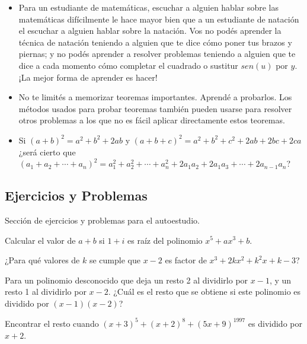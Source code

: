 \begin{itemize}
    \item Para un estudiante de matemáticas, escuchar a alguien hablar sobre las matemáticas difícilmente le hace mayor bien que a un estudiante de natación el escuchar a alguien hablar sobre la natación.
    Vos no podés aprender la técnica de natación teniendo a alguien que te dice cómo poner tus brazos y piernas; y no podés aprender a resolver problemas teniendo a alguien que te dice a cada momento cómo completar el cuadrado o sustitur $sen(u)$ por $y$.
    ¡La mejor forma de aprender es hacer!
    \item No te limités a memorizar teoremas importantes. Aprendé a probarlos. Los métodos usados para probar teoremas también pueden usarse para resolver otros problemas a los que no es fácil aplicar directamente estos teoremas.
    \item Si $(a + b)^2 = a^2 + b^2 + 2ab$ y $(a + b + c)^2 = a^2 + b^2 + c^2 + 2ab + 2bc + 2ca$ ¿será cierto que $(a_1 + a_2 + \cdots + a_n)^2 = a_1^2 + a_2^2 + \cdots + a_n^2 + 2a_1 a_2 + 2a_1 a_3 + \cdots + 2a_{n-1}a_n$?
\end{itemize}



\subsection{Ejercicios y Problemas}

Sección de ejercicios y problemas para el autoestudio.

\begin{section-problem}
    Calcular el valor de $a + b$ si $1 + i$ es raíz del polinomio $x^5 + ax^3 + b$.
\end{section-problem}

\begin{section-problem}
    ¿Para qué valores de $k$ se cumple que $x - 2$ es factor de $x^3 + 2kx^2 + k^2 x + k - 3$?
\end{section-problem}

\begin{section-problem}
    Para un polinomio desconocido que deja un resto 2 al dividirlo por $x - 1$, y un resto 1 al dividirlo por $x - 2$.
    ¿Cuál es el resto que se obtiene si este polinomio es dividido por $(x - 1)(x - 2)$?
\end{section-problem}

\begin{section-problem}
    Encontrar el resto cuando $(x + 3)^5 + (x + 2)^8 + (5x + 9)^{1997}$ es dividido por $x + 2$.
\end{section-problem}

